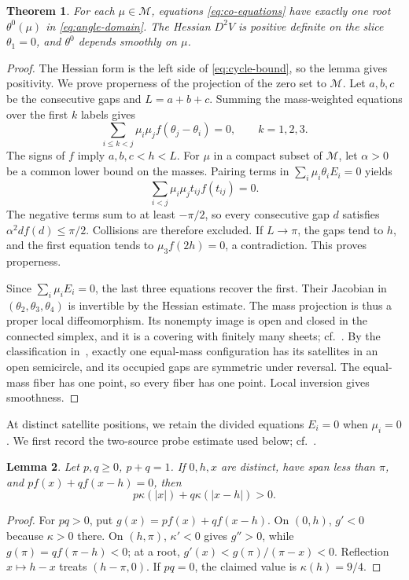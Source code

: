 \documentclass[11pt,a4paper]{article}
\numberwithin{equation}{section}
\newtheorem{theorem}{Theorem}[section]
\newtheorem{lemma}[theorem]{Lemma}
\theoremstyle{remark}
\newcommand{\M}{\mathcal M}
\begin{document}
\begin{theorem}\label{thm:coorbital}
For each $\mu\in\M$, equations \eqref{eq:co-equations} have exactly one root $\theta^0(\mu)$ in \eqref{eq:angle-domain}. The Hessian $D^2V$ is positive definite on the slice $\theta_1=0$, and $\theta^0$ depends smoothly on $\mu$.
\end{theorem}
\begin{proof}
The Hessian form is the left side of \eqref{eq:cycle-bound}, so the lemma gives positivity. We prove properness of the projection of the zero set to $\M$. Let $a,b,c$ be the consecutive gaps and $L=a+b+c$. Summing the mass-weighted equations over the first $k$ labels gives
\begin{equation}\label{eq:co-cut}
 \sum_{i\le k<j}\mu_i\mu_jf(\theta_j-\theta_i)=0,\qquad k=1,2,3.
\end{equation}
The signs of $f$ imply $a,b,c<h<L$. For $\mu$ in a compact subset of $\M$, let $\alpha>0$ be a common lower bound on the masses. Pairing terms in $\sum_i\mu_i\theta_iE_i=0$ yields
\[
 \sum_{i<j}\mu_i\mu_jt_{ij}f(t_{ij})=0.
\]
The negative terms sum to at least $-\pi/2$, so every consecutive gap $d$ satisfies $\alpha^2df(d)\le\pi/2$. Collisions are therefore excluded. If $L\to\pi$, the gaps tend to $h$, and the first equation tends to $\mu_3f(2h)=0$, a contradiction. This proves properness.

Since $\sum_i\mu_iE_i=0$, the last three equations recover the first.
Their Jacobian in $(\theta_2,\theta_3,\theta_4)$ is invertible by the Hessian estimate. The mass projection is thus a proper local diffeomorphism. Its nonempty image is open and closed in the connected simplex, and it is a covering with finitely many sheets; cf.~\cite[proof of Proposition~3]{CCLM}. By the classification in~\cite[main theorem]{AF}, exactly one equal-mass configuration has its satellites in an open semicircle, and its occupied gaps are symmetric under reversal. The equal-mass fiber has one point, so every fiber has one point. Local inversion gives smoothness.
\end{proof}

At distinct satellite positions, we retain the divided equations $E_i=0$ when $\mu_i=0$.
We first record the two-source probe estimate used below; cf.~\cite{DHW}.

\begin{lemma}\label{lem:probe}
Let $p,q\ge0$, $p+q=1$. If $0,h,x$ are distinct, have span less than $\pi$, and
$pf(x)+qf(x-h)=0$, then
\[
 p\kappa(|x|)+q\kappa(|x-h|)>0.
\]
\end{lemma}
\begin{proof}
For $pq>0$, put $g(x)=pf(x)+qf(x-h)$. On $(0,h)$, $g'<0$ because $\kappa>0$ there. On $(h,\pi)$, $\kappa'<0$ gives $g''>0$, while $g(\pi)=qf(\pi-h)<0$; at a root,
$g'(x)<g(\pi)/(\pi-x)<0$. Reflection $x\mapsto h-x$ treats $(h-\pi,0)$.
If $pq=0$, the claimed value is $\kappa(h)=9/4$.
\end{proof}
\end{document}
